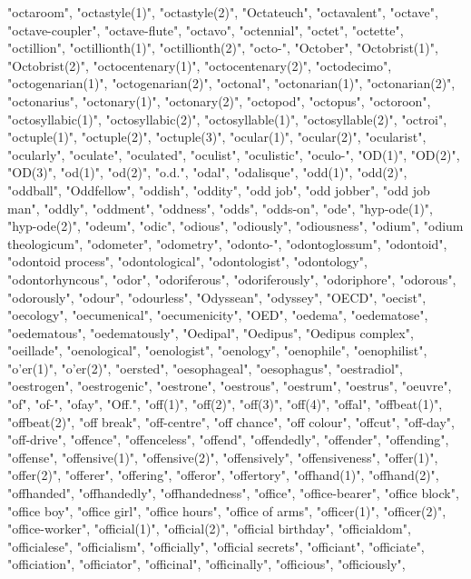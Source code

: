 "octaroom",
"octastyle(1)",
"octastyle(2)",
"Octateuch",
"octavalent",
"octave",
"octave-coupler",
"octave-flute",
"octavo",
"octennial",
"octet",
"octette",
"octillion",
"octillionth(1)",
"octillionth(2)",
"octo-",
"October",
"Octobrist(1)",
"Octobrist(2)",
"octocentenary(1)",
"octocentenary(2)",
"octodecimo",
"octogenarian(1)",
"octogenarian(2)",
"octonal",
"octonarian(1)",
"octonarian(2)",
"octonarius",
"octonary(1)",
"octonary(2)",
"octopod",
"octopus",
"octoroon",
"octosyllabic(1)",
"octosyllabic(2)",
"octosyllable(1)",
"octosyllable(2)",
"octroi",
"octuple(1)",
"octuple(2)",
"octuple(3)",
"ocular(1)",
"ocular(2)",
"ocularist",
"ocularly",
"oculate",
"oculated",
"oculist",
"oculistic",
"oculo-",
"OD(1)",
"OD(2)",
"OD(3)",
"od(1)",
"od(2)",
"o.d.",
"odal",
"odalisque",
"odd(1)",
"odd(2)",
"oddball",
"Oddfellow",
"oddish",
"oddity",
"odd job",
"odd jobber",
"odd job man",
"oddly",
"oddment",
"oddness",
"odds",
"odds-on",
"ode",
"hyp-ode(1)",
"hyp-ode(2)",
"odeum",
"odic",
"odious",
"odiously",
"odiousness",
"odium",
"odium theologicum",
"odometer",
"odometry",
"odonto-",
"odontoglossum",
"odontoid",
"odontoid process",
"odontological",
"odontologist",
"odontology",
"odontorhyncous",
"odor",
"odoriferous",
"odoriferously",
"odoriphore",
"odorous",
"odorously",
"odour",
"odourless",
"Odyssean",
"odyssey",
"OECD",
"oecist",
"oecology",
"oecumenical",
"oecumenicity",
"OED",
"oedema",
"oedematose",
"oedematous",
"oedematously",
"Oedipal",
"Oedipus",
"Oedipus complex",
"oeillade",
"oenological",
"oenologist",
"oenology",
"oenophile",
"oenophilist",
"o'er(1)",
"o'er(2)",
"oersted",
"oesophageal",
"oesophagus",
"oestradiol",
"oestrogen",
"oestrogenic",
"oestrone",
"oestrous",
"oestrum",
"oestrus",
"oeuvre",
"of",
"of-",
"ofay",
"Off.",
"off(1)",
"off(2)",
"off(3)",
"off(4)",
"offal",
"offbeat(1)",
"offbeat(2)",
"off break",
"off-centre",
"off chance",
"off colour",
"offcut",
"off-day",
"off-drive",
"offence",
"offenceless",
"offend",
"offendedly",
"offender",
"offending",
"offense",
"offensive(1)",
"offensive(2)",
"offensively",
"offensiveness",
"offer(1)",
"offer(2)",
"offerer",
"offering",
"offeror",
"offertory",
"offhand(1)",
"offhand(2)",
"offhanded",
"offhandedly",
"offhandedness",
"office",
"office-bearer",
"office block",
"office boy",
"office girl",
"office hours",
"office of arms",
"officer(1)",
"officer(2)",
"office-worker",
"official(1)",
"official(2)",
"official birthday",
"officialdom",
"officialese",
"officialism",
"officially",
"official secrets",
"officiant",
"officiate",
"officiation",
"officiator",
"officinal",
"officinally",
"officious",
"officiously",

